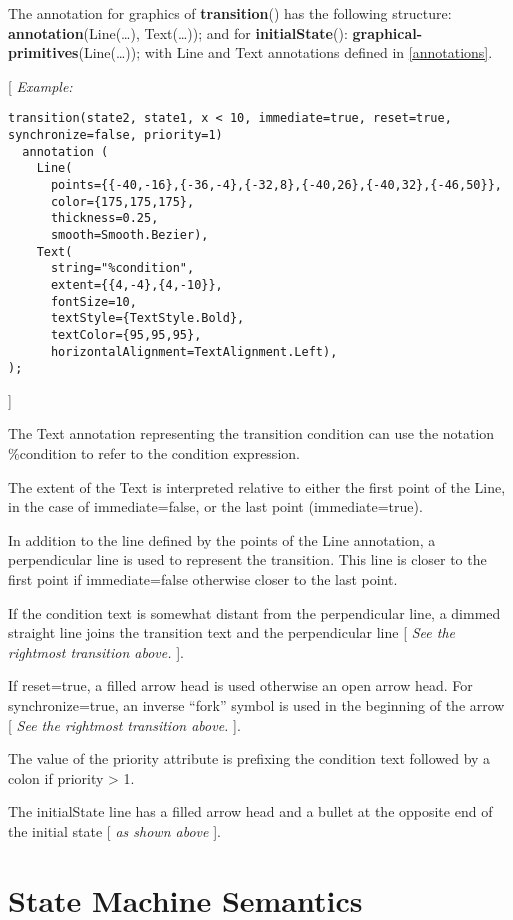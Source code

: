 The annotation for graphics of \textbf{transition}() has the following
structure: \textbf{annotation}(Line(\ldots{}), Text(\ldots{})); and for
\textbf{initialState}(): \textbf{graphical-primitives}(Line(\ldots{})); with Line
and Text annotations defined in \autoref{annotations}.

{[} \emph{Example:}
\begin{lstlisting}[language=modelica]
transition(state2, state1, x < 10, immediate=true, reset=true, synchronize=false, priority=1)
  annotation (
    Line(
      points={{-40,-16},{-36,-4},{-32,8},{-40,26},{-40,32},{-46,50}},
      color={175,175,175},
      thickness=0.25,
      smooth=Smooth.Bezier),
    Text(
      string="%condition",
      extent={{4,-4},{4,-10}},
      fontSize=10,
      textStyle={TextStyle.Bold},
      textColor={95,95,95},
      horizontalAlignment=TextAlignment.Left),
);
\end{lstlisting}
{]}

The Text annotation representing the transition condition can use the
notation \%condition to refer to the condition expression.

The extent of the Text is interpreted relative to either the first point
of the Line, in the case of immediate=false, or the last point
(immediate=true).

In addition to the line defined by the points of the Line annotation, a
perpendicular line is used to represent the transition. This line is
closer to the first point if immediate=false otherwise closer to the
last point.

If the condition text is somewhat distant from the perpendicular line, a
dimmed straight line joins the transition text and the perpendicular
line {[} \emph{See the rightmost transition above.} {]}.

If reset=true, a filled arrow head is used otherwise an open arrow head.
For synchronize=true, an inverse ``fork'' symbol is used in the
beginning of the arrow {[} \emph{See the rightmost transition above.}
{]}.

The value of the priority attribute is prefixing the condition text
followed by a colon if priority \textgreater{} 1.

The initialState line has a filled arrow head and a bullet at the
opposite end of the initial state {[} \emph{as shown above} {]}.

\section{State Machine Semantics}

